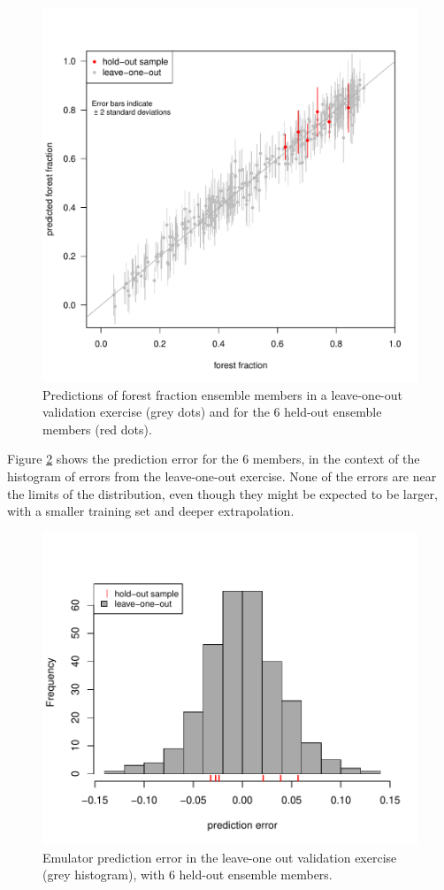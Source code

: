 \documentclass[gmd, manuscript]{copernicus} %
\begin{document}
\begin{figure}[t]
\includegraphics[width=12cm]{../graphics/holdout1_vs_loo_compact.pdf}
\caption{Predictions of forest fraction ensemble members in a leave-one-out validation exercise (grey dots) and for the 6 held-out ensemble members (red dots).}
\label{fig:holdout1_vs_loo_compact}
\end{figure}

Figure \ref{fig:holdout1_error_hist} shows the prediction error for the 6 members, in the context of the histogram of errors from the leave-one-out exercise. None of the errors are near the limits of the distribution, even though they might be expected to be larger, with a smaller training set and deeper extrapolation.

\begin{figure}[t]
\includegraphics[width=12cm]{../graphics/holdout1_error_hist.pdf}
\caption{Emulator prediction error in the leave-one out validation exercise (grey histogram), with 6 held-out ensemble members.}
\label{fig:holdout1_error_hist}
\end{figure}
\end{document}
